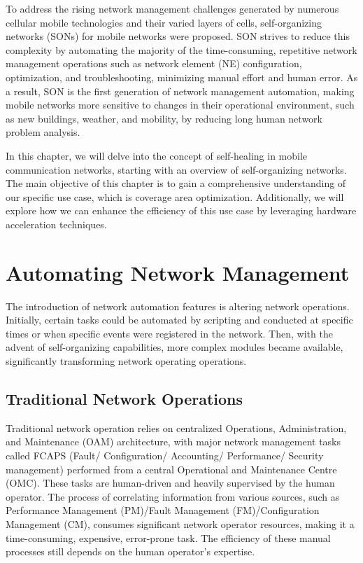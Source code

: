 \setlength{\parskip}{\baselineskip}



To address the rising network management challenges generated by numerous cellular mobile technologies and their varied layers of cells, self-organizing networks (SONs) for mobile networks were proposed. SON strives to reduce this complexity by automating the majority of the time-consuming, repetitive network management operations such as network element (NE) configuration, optimization, and troubleshooting, minimizing manual effort and human error. As a result, SON is the first generation of network management automation, making mobile networks more sensitive to changes in their operational environment, such as new buildings, weather, and mobility, by reducing long human network problem analysis.

In this chapter, we will delve into the concept of self-healing in mobile communication networks, starting with an overview of self-organizing networks. The main objective of this chapter is to gain a comprehensive understanding of our specific use case, which is coverage area optimization. Additionally, we will explore how we can enhance the efficiency of this use case by leveraging hardware acceleration techniques.


\section{Automating Network Management}

The introduction of network automation features is altering network operations. Initially, certain tasks could be automated by scripting and conducted at specific times or when specific events were registered in the network. Then, with the advent of self-organizing capabilities, more complex modules became available, significantly transforming network operating operations.

\subsection{Traditional Network Operations}

Traditional network operation relies on centralized Operations, Administration, and Maintenance (OAM) architecture, with major network management tasks called FCAPS  (Fault/ Configuration/ Accounting/ Performance/ Security management) performed from a central Operational and Maintenance Centre (OMC). These tasks are human-driven and heavily supervised by the human operator. The process of correlating information from various sources, such as Performance Management (PM)/Fault Management (FM)/Configuration Management (CM), consumes significant network operator resources, making it a time-consuming, expensive, error-prone task. The efficiency of these manual processes still depends on the human operator's expertise. \cite{laiho2006radio}

